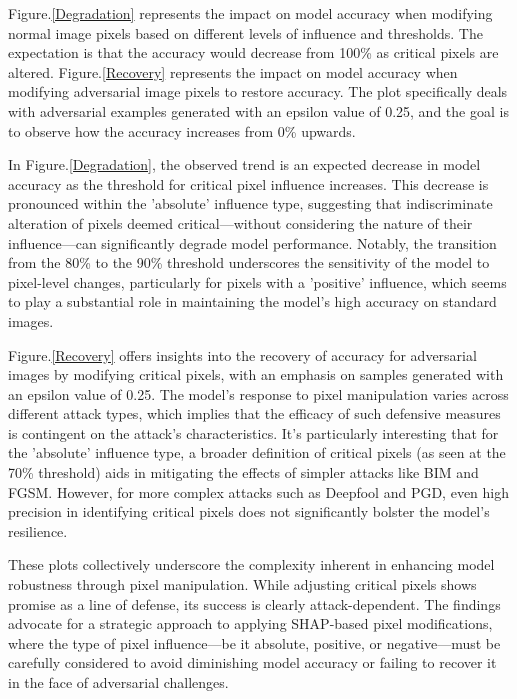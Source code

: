 \documentclass[10pt, conference, a4paper, final]{IEEEtran}
\begin{document}
Figure.\ref{Degradation} represents the impact on model accuracy when modifying normal image pixels based on different levels of influence and thresholds. The expectation is that the accuracy would decrease from 100\% as critical pixels are altered.
Figure.\ref{Recovery} represents the impact on model accuracy when modifying adversarial image pixels to restore accuracy. The plot specifically deals with adversarial examples generated with an epsilon value of 0.25, and the goal is to observe how the accuracy increases from 0\% upwards.
 
In Figure.\ref{Degradation}, the observed trend is an expected decrease in model accuracy as the threshold for critical pixel influence increases. This decrease is pronounced within the 'absolute' influence type, suggesting that indiscriminate alteration of pixels deemed critical—without considering the nature of their influence—can significantly degrade model performance. Notably, the transition from the 80\% to the 90\% threshold underscores the sensitivity of the model to pixel-level changes, particularly for pixels with a 'positive' influence, which seems to play a substantial role in maintaining the model's high accuracy on standard images.

Figure.\ref{Recovery} offers insights into the recovery of accuracy for adversarial images by modifying critical pixels, with an emphasis on samples generated with an epsilon value of 0.25. The model's response to pixel manipulation varies across different attack types, which implies that the efficacy of such defensive measures is contingent on the attack's characteristics. It's particularly interesting that for the 'absolute' influence type, a broader definition of critical pixels (as seen at the 70\% threshold) aids in mitigating the effects of simpler attacks like BIM and FGSM. However, for more complex attacks such as Deepfool and PGD, even high precision in identifying critical pixels does not significantly bolster the model's resilience.

These plots collectively underscore the complexity inherent in enhancing model robustness through pixel manipulation. While adjusting critical pixels shows promise as a line of defense, its success is clearly attack-dependent. The findings advocate for a strategic approach to applying SHAP-based pixel modifications, where the type of pixel influence—be it absolute, positive, or negative—must be carefully considered to avoid diminishing model accuracy or failing to recover it in the face of adversarial challenges.
\end{document}
